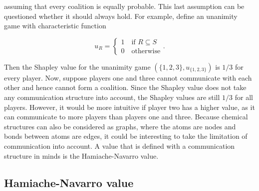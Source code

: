 assuming that every coalition is equally probable. This last assumption can be questioned whether it should 
always hold. For example, define an unanimity game with characteristic function 

\begin{equation}
    u_R = \begin{cases}
        1 \quad \text{if } R \subseteq S \\
        0 \quad \text{otherwise}
\end{cases}.
\end{equation}

Then the Shapley value for the unanimity game $(\{1, 2, 3\}, u_{\{1, 2, 3\}})$ is $1/3$ for every player.\cite{hamiache_value_1999} 
Now, suppose players one and three cannot communicate with each other and hence cannot form a coalition. Since 
the Shapley value does not take any communication structure into account, the Shapley values are still $1/3$ 
for all players. However, it would be more intuitive if player two has a higher value, as it can communicate 
to more players than players one and three. Because chemical structures can also be considered as graphs, where 
the atoms are nodes and bonds between atoms are edges, it could be interesting to take the limitation of communication 
into account. A value that is defined with a communication structure in minds is the Hamiache-Navarro value.\cite{hamiache_value_1999, hamiache_associated_2020}

\subsection{Hamiache-Navarro value}
